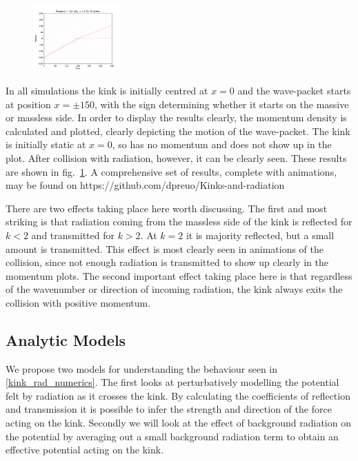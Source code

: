 \documentclass[11pt, oneside]{article}  	%
\numberwithin{equation}{section}
\begin{document}
\begin{figure}
\includegraphics[width=0.3\textwidth]{MomentumDensityk275Massless.pdf}
 \label{radiation_results}
\end{figure}
In all simulations the kink is initially centred at $x=0$ and the wave-packet starts at position $x=\pm150$, with the sign determining whether it starts on the massive or massless side. In order to display the results clearly, the momentum density is calculated and plotted, clearly depicting the motion of the wave-packet. The kink is initially static at $x=0$, so has no momentum and does not show up in the plot. After collision with radiation, however, it can be clearly seen. These results are shown in fig.~\ref{radiation_results}. A comprehensive set of results, complete with animations, may be found on https://github.com/dpreuo/Kinks-and-radiation\par
There are two effects taking place here worth discussing. The first and most striking is that radiation coming from the massless side of the kink is reflected for $k < 2$ and transmitted for $k>2$. At $k = 2$ it is majority reflected, but a small amount is transmitted. This effect is most clearly seen in animations of the collision, since not enough radiation is transmitted to show up clearly in the momentum plots. The second important effect taking place here is that regardless of the wavenumber or direction of incoming radiation, the kink always exits the collision with positive momentum. 

 \subsection{Analytic Models} \label{rad-anal}
 We propose two models for understanding the behaviour seen in \textsection \ref{kink_rad_numerics}. The first looks at perturbatively modelling the potential felt by radiation as it crosses the kink. By calculating the coefficients of reflection and transmission it is possible to infer the strength and direction of the force acting on the kink. Secondly we will look at the effect of background radiation on the potential by averaging out a small background radiation term to obtain an effective potential acting on the kink.
\end{document}
